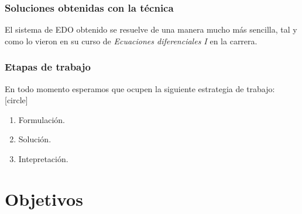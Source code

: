 \begin{frame}
\frametitle{Soluciones obtenidas con la técnica}
El sistema de EDO obtenido se resuelve de una manera mucho más sencilla, tal y como lo vieron en su curso de \emph{Ecuaciones diferenciales I} en la carrera.
\end{frame}
\begin{frame}
\frametitle{Etapas de trabajo}
En todo momento esperamos que ocupen la siguiente estrategia de trabajo:
[circle]
\begin{enumerate}[<+->]
\item Formulación.
\item Solución.
\item Intepretación.
\end{enumerate}
\end{frame}
\section{Objetivos}

